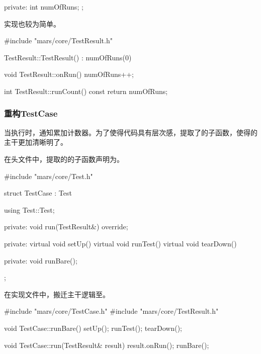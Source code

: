 \begin{content}
\begin{leftbar}
\begin{c++}[caption={\ttfamily{include/mars/core/TestResult.h}}]
{private:
  int numOfRuns;
};
 \end{c++}
\end{leftbar}

实现也较为简单。

\begin{leftbar}
 \begin{c++}[caption={\ttfamily{src/mars/core/TestResult.cc}}]
#include "mars/core/TestResult.h"

TestResult::TestResult() : numOfRuns(0) {
}

void TestResult::onRun() {
  numOfRuns++;
}

int TestResult::runCount() const {
  return numOfRuns;
}
 \end{c++}
\end{leftbar}

\subsubsection{重构TestCase}

当执行时，通知累加计数器。为了使得代码具有层次感，提取了的子函数，使得的主干更加清晰明了。

在头文件中，提取的的子函数声明为。

\begin{leftbar}
 \begin{c++}[caption={\ttfamily{include/mars/core/TestCase.h}}]
#include "mars/core/Test.h"

struct TestCase : Test {
  using Test::Test;

private:
  void run(TestResult&) override;

private:
  virtual void setUp() {}
  virtual void runTest() {}
  virtual void tearDown() {}

private:
  void runBare();
};
 \end{c++}
\end{leftbar}

在实现文件中，搬迁主干逻辑至。

\begin{leftbar}
 \begin{c++}[caption={\ttfamily{src/mars/core/TestCase.cc}}]
#include "mars/core/TestCase.h"
#include "mars/core/TestResult.h"

void TestCase::runBare() {
  setUp();
  runTest();
  tearDown();
}

void TestCase::run(TestResult& result) {
  result.onRun();
  runBare();
}
 \end{c++}
\end{leftbar}


\end{content}
